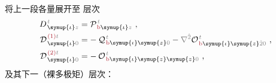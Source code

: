将上一段各量展开至  层次
\begin{subequations} \label{eq:DH^(2-0)_0}
\begin{align}
	D^{\;\!\mathcolor{gray}{t}}_{\;\! \symup{\iota}\mathcolor{gray}{z}} &= {\mathcal{P}}^{\;\!\mathcolor{gray}{t}}_{\;\!\textcolor{Maroon}{\text{b}} \symup{\iota} \mathcolor{gray}{z}}~, \label{eq:D^(0)} \\
	{\mathcal{D}}^{\;\!\textcolor{Maroon}{(1)}\mathcolor{gray}{t}}_{\;\! \symup{\iota}\mathcolor{gray}{0}} &= -\hspace{0.2em} {\mathcal{Q}}^{\;\!\mathcolor{gray}{t}}_{\;\!\textcolor{Maroon}{\text{b}} \symup{\iota}\symup{z} \mathcolor{gray}{0}} - \mathcolor{gray}{\nabla^{\hat{2}}} {\mathcal{O}}^{\;\!\mathcolor{gray}{t}}_{\;\!\textcolor{Maroon}{\text{b}} \symup{\iota} \symup{z} \mathcolor{gray}{\hat{2}} \mathcolor{gray}{0}}~, \label{eq:D^(1)_0} \\
	{\mathcal{D}}^{\;\!\textcolor{Maroon}{(2)}\mathcolor{gray}{t}}_{\;\! \symup{\iota}\mathcolor{gray}{0}} &= -\hspace{0.2em} {\mathcal{O}}^{\;\!\mathcolor{gray}{t}}_{\;\!\textcolor{Maroon}{\text{b}} \symup{\iota} \symup{z}\symup{z} \mathcolor{gray}{0}}~, \label{eq:D^(2)_0}
\end{align}
\end{subequations}
及其下一（裸多极矩）层次\cite{OriginDependenceMaterial,langeCompletionMultipoleTheory2003,raabTransformedMultipoleTheory2005,grahamMultipoleSolutionMacroscopic2000}：
